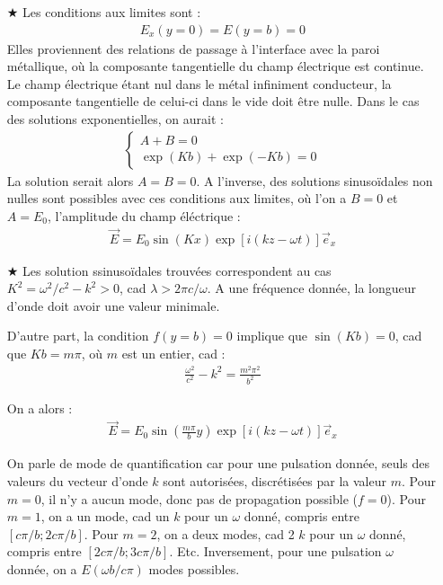 \documentclass{report}
\begin{document}
\begin{itemize}
	\item[$\bigstar$] Les conditions aux limites sont :
	\begin{align*}
		E_x(y=0)=E(y=b)=0
	\end{align*}
	Elles proviennent des relations de passage à l'interface avec la paroi métallique, où la composante tangentielle du champ électrique est continue. Le champ électrique étant nul dans le métal infiniment conducteur, la composante tangentielle de celui-ci dans le vide doit être nulle.
	Dans le cas des solutions exponentielles, on aurait :
	\begin{align}
    	\begin{cases}
        A+B  =0\\
     	\exp(Kb)+\exp(-Kb) = 0
    \end{cases}  
	\end{align}
	La solution serait alors $A=B=0$. A l'inverse, des solutions sinusoïdales non nulles sont possibles avec ces conditions aux limites, où l'on a $B=0$ et $A=E_0$, l'amplitude du champ éléctrique :
	\begin{align*}
		\vec{E}=E_0\sin(Kx)\exp[i(kz-\omega t)]\vec{e}_x
	\end{align*}
	
	\item[$\bigstar$]	Les solution ssinusoïdales trouvées correspondent au cas $K^2=\omega^2/c^2-k^2>0$, cad $\lambda>2\pi c/\omega$. A une fréquence donnée, la longueur d'onde doit avoir une valeur minimale.
	
	 D'autre part, la condition $f(y=b)=0$ implique que $\sin(Kb)=0$, cad que $Kb=m\pi$, où $m$ est un entier, cad :
	 \begin{align*}
	 	\frac{\omega^2}{c^2}-k^2=\frac{m^2\pi^2}{b^2}
	 \end{align*}
	 
	On a alors :	 
	\begin{align*}
		\vec{E}=E_0\sin\left(\frac{m\pi}{b}y\right) \exp[i(kz-\omega t)]\vec{e}_x
	\end{align*}
		 
	 On parle de mode de quantification car pour une pulsation donnée, seuls des valeurs du vecteur d'onde $k$ sont autorisées, discrétisées par la valeur $m$. Pour $m=0$, il n'y a  aucun mode, donc pas de propagation possible ($f=0$). Pour $m=1$, on a un mode, cad un $k$ pour un $\omega$ donné, compris entre $[c\pi/b;2c\pi/b]$. Pour $m=2$, on a deux modes, cad 2 $k$ pour un $\omega$ donné, compris entre $[2c\pi/b;3c\pi/b]$. Etc. Inversement, pour une pulsation $\omega$ donnée, on a $E(\omega b/c\pi)$ modes possibles.
	 

\end{itemize}
\end{document}
